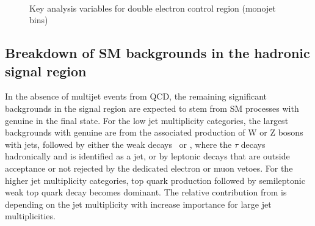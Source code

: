 \begin{figure}
\begin{center}
         \\
        \caption{Key analysis variables for double electron control region (monojet bins)}
        \label{fig:distribution_doubleele_mono}
    \end{center}
\end{figure}

\clearpage

\subsection{Breakdown of SM backgrounds in the hadronic signal
  region\label{sec:bkgd-comp}}

In the absence of multijet events from QCD, the remaining significant
backgrounds in the signal region are expected to stem from SM
processes with genuine \met in the final state. For the low jet
multiplicity categories, the largest backgrounds with genuine \met are
 from the associated production of W or Z bosons with jets,
followed by either the weak decays \znunu\ or \wtaunu, where the
$\tau$ decays hadronically and is identified as a jet, or by leptonic
decays that are outside acceptance or not rejected by the dedicated
electron or muon vetoes. For the higher jet multiplicity categories,
top quark production followed by semileptonic weak top quark decay
becomes dominant. The relative contribution from \ttbar is depending on 
the jet multiplicity with increase importance for large jet multiplicities.

